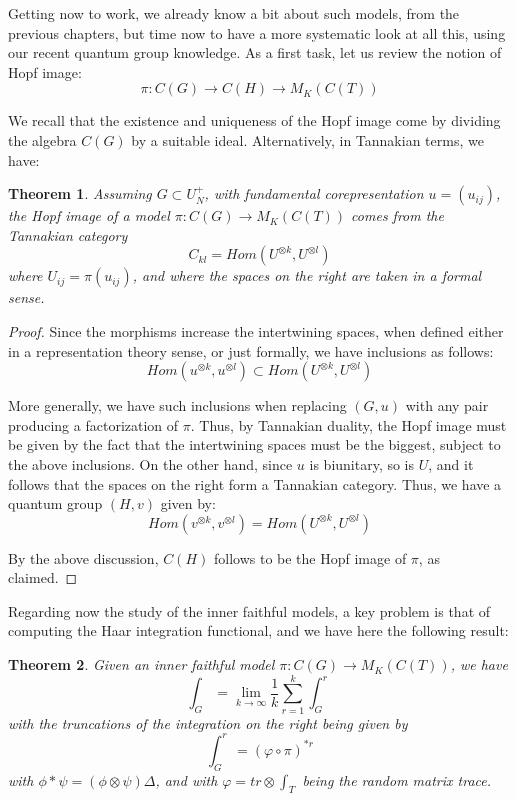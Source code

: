 \documentclass[12pt]{amsbook}
\newtheorem{theorem}{Theorem}[chapter]
\begin{document}
Getting now to work, we already know a bit about such models, from the previous chapters, but time now to have a more systematic look at all this, using our recent quantum group knowledge. As a first task, let us review the notion of Hopf image:
$$\pi:C(G)\to C(H)\to M_K(C(T))$$

We recall that the existence and uniqueness of the Hopf image come by dividing the algebra $C(G)$ by a suitable ideal. Alternatively, in Tannakian terms, we have:


\begin{theorem}
Assuming $G\subset U_N^+$, with fundamental corepresentation $u=(u_{ij})$, the Hopf image of a model $\pi:C(G)\to M_K(C(T))$ comes from the Tannakian category
$$C_{kl}=Hom(U^{\otimes k},U^{\otimes l})$$
where $U_{ij}=\pi(u_{ij})$, and where the spaces on the right are taken in a formal sense.
\end{theorem}

\begin{proof}
Since the morphisms increase the intertwining spaces, when defined either in a representation theory sense, or just formally, we have inclusions as follows:
$$Hom(u^{\otimes k},u^{\otimes l})\subset Hom(U^{\otimes k},U^{\otimes l})$$

More generally, we have such inclusions when replacing $(G,u)$ with any pair producing a factorization of $\pi$. Thus, by Tannakian duality, the Hopf image must be given by the fact that the intertwining spaces must be the biggest, subject to the above inclusions. On the other hand, since $u$ is biunitary, so is $U$, and it follows that the spaces on the right form a Tannakian category. Thus, we have a quantum group $(H,v)$ given by:
$$Hom(v^{\otimes k},v^{\otimes l})=Hom(U^{\otimes k},U^{\otimes l})$$

By the above discussion, $C(H)$ follows to be the Hopf image of $\pi$, as claimed.
\end{proof}

Regarding now the study of the inner faithful models, a key problem is that of computing the Haar integration functional, and we have here the following result:


\begin{theorem}
Given an inner faithful model $\pi:C(G)\to M_K(C(T))$, we have
$$\int_G=\lim_{k\to\infty}\frac{1}{k}\sum_{r=1}^k\int_G^r$$
with the truncations of the integration on the right being given by
$$\int_G^r=(\varphi\circ\pi)^{*r}$$
with $\phi*\psi=(\phi\otimes\psi)\Delta$, and with $\varphi=tr\otimes\int_T$ being the random matrix trace.
\end{theorem}
\end{document}
